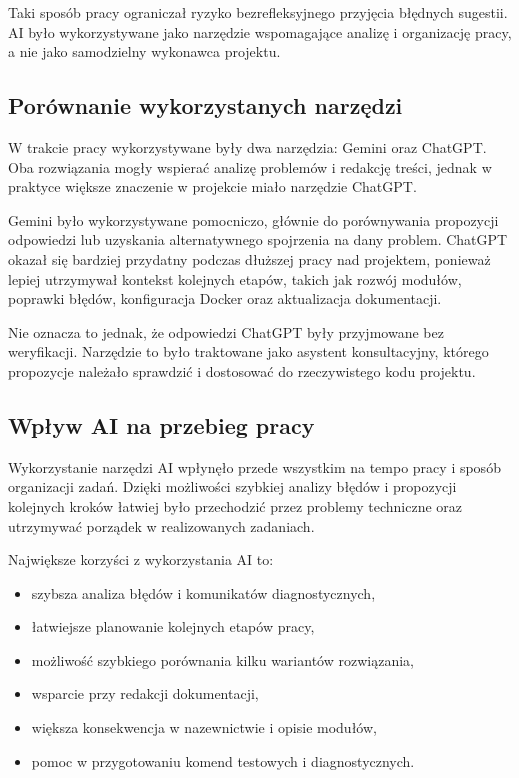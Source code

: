 Taki sposób pracy ograniczał ryzyko bezrefleksyjnego przyjęcia błędnych sugestii. AI było wykorzystywane jako narzędzie wspomagające analizę i organizację pracy, a nie jako samodzielny wykonawca projektu.

\subsection{Porównanie wykorzystanych narzędzi}

W trakcie pracy wykorzystywane były dwa narzędzia: Gemini oraz ChatGPT. Oba rozwiązania mogły wspierać analizę problemów i redakcję treści, jednak w praktyce większe znaczenie w projekcie miało narzędzie ChatGPT.

Gemini było wykorzystywane pomocniczo, głównie do porównywania propozycji odpowiedzi lub uzyskania alternatywnego spojrzenia na dany problem. ChatGPT okazał się bardziej przydatny podczas dłuższej pracy nad projektem, ponieważ lepiej utrzymywał kontekst kolejnych etapów, takich jak rozwój modułów, poprawki błędów, konfiguracja Docker oraz aktualizacja dokumentacji.

Nie oznacza to jednak, że odpowiedzi ChatGPT były przyjmowane bez weryfikacji. Narzędzie to było traktowane jako asystent konsultacyjny, którego propozycje należało sprawdzić i dostosować do rzeczywistego kodu projektu.

\subsection{Wpływ AI na przebieg pracy}

Wykorzystanie narzędzi AI wpłynęło przede wszystkim na tempo pracy i sposób organizacji zadań. Dzięki możliwości szybkiej analizy błędów i propozycji kolejnych kroków łatwiej było przechodzić przez problemy techniczne oraz utrzymywać porządek w realizowanych zadaniach.

Największe korzyści z wykorzystania AI to:
\begin{itemize}
    \item szybsza analiza błędów i komunikatów diagnostycznych,
    \item łatwiejsze planowanie kolejnych etapów pracy,
    \item możliwość szybkiego porównania kilku wariantów rozwiązania,
    \item wsparcie przy redakcji dokumentacji,
    \item większa konsekwencja w nazewnictwie i opisie modułów,
    \item pomoc w przygotowaniu komend testowych i diagnostycznych.
\end{itemize}

